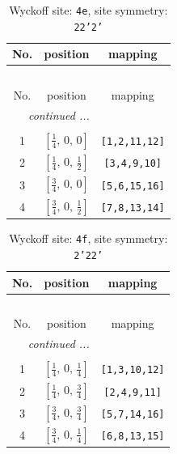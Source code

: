 \documentclass[fleqn,8pt]{jsarticle}
\begin{document}
\renewcommand{\arraystretch}{1.2}
\begin{longtable}{ccc}
\caption{Wyckoff site: {\tt 4e}, site symmetry: {\tt 22'2'}}
 \\
 \hline \hline
No. & position & mapping \\ \hline \endfirsthead

\multicolumn{2}{l}{\tablename\ \thetable{}} \\
 \hline \hline
No. & position & mapping \\ \hline \endhead

 \hline \hline
\multicolumn{2}{r}{\footnotesize\it continued ...} \\ \endfoot

 \hline \hline
\multicolumn{2}{r}{} \\ \endlastfoot

1 & $\left[ \frac{1}{4},\, 0,\, 0 \right]$ & {\tt [1,2,11,12]} \\ \hline
2 & $\left[ \frac{1}{4},\, 0,\, \frac{1}{2} \right]$ & {\tt [3,4,9,10]} \\ \hline
3 & $\left[ \frac{3}{4},\, 0,\, 0 \right]$ & {\tt [5,6,15,16]} \\ \hline
4 & $\left[ \frac{3}{4},\, 0,\, \frac{1}{2} \right]$ & {\tt [7,8,13,14]} \\
\end{longtable}
\renewcommand{\arraystretch}{1.2}
\begin{longtable}{ccc}
\caption{Wyckoff site: {\tt 4f}, site symmetry: {\tt 2'22'}}
 \\
 \hline \hline
No. & position & mapping \\ \hline \endfirsthead

\multicolumn{2}{l}{\tablename\ \thetable{}} \\
 \hline \hline
No. & position & mapping \\ \hline \endhead

 \hline \hline
\multicolumn{2}{r}{\footnotesize\it continued ...} \\ \endfoot

 \hline \hline
\multicolumn{2}{r}{} \\ \endlastfoot

1 & $\left[ \frac{1}{4},\, 0,\, \frac{1}{4} \right]$ & {\tt [1,3,10,12]} \\ \hline
2 & $\left[ \frac{1}{4},\, 0,\, \frac{3}{4} \right]$ & {\tt [2,4,9,11]} \\ \hline
3 & $\left[ \frac{3}{4},\, 0,\, \frac{3}{4} \right]$ & {\tt [5,7,14,16]} \\ \hline
4 & $\left[ \frac{3}{4},\, 0,\, \frac{1}{4} \right]$ & {\tt [6,8,13,15]} \\
\end{longtable}
\end{document}
